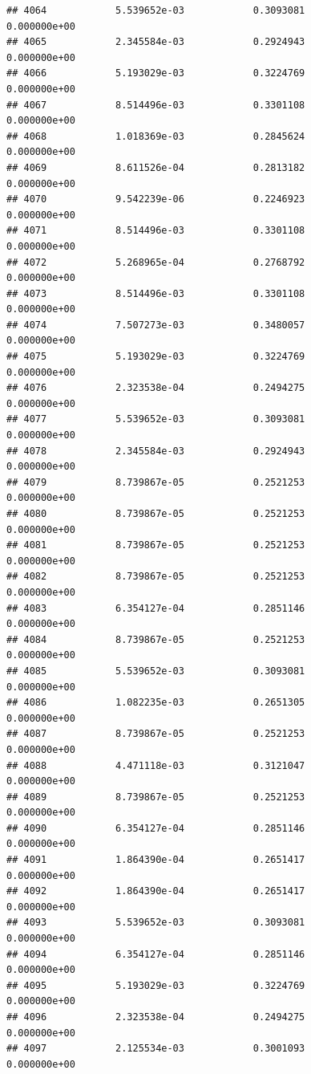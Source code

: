 \documentclass[
]{article}
\begin{document}
\begin{verbatim}
## 4064            5.539652e-03            0.3093081            0.000000e+00
## 4065            2.345584e-03            0.2924943            0.000000e+00
## 4066            5.193029e-03            0.3224769            0.000000e+00
## 4067            8.514496e-03            0.3301108            0.000000e+00
## 4068            1.018369e-03            0.2845624            0.000000e+00
## 4069            8.611526e-04            0.2813182            0.000000e+00
## 4070            9.542239e-06            0.2246923            0.000000e+00
## 4071            8.514496e-03            0.3301108            0.000000e+00
## 4072            5.268965e-04            0.2768792            0.000000e+00
## 4073            8.514496e-03            0.3301108            0.000000e+00
## 4074            7.507273e-03            0.3480057            0.000000e+00
## 4075            5.193029e-03            0.3224769            0.000000e+00
## 4076            2.323538e-04            0.2494275            0.000000e+00
## 4077            5.539652e-03            0.3093081            0.000000e+00
## 4078            2.345584e-03            0.2924943            0.000000e+00
## 4079            8.739867e-05            0.2521253            0.000000e+00
## 4080            8.739867e-05            0.2521253            0.000000e+00
## 4081            8.739867e-05            0.2521253            0.000000e+00
## 4082            8.739867e-05            0.2521253            0.000000e+00
## 4083            6.354127e-04            0.2851146            0.000000e+00
## 4084            8.739867e-05            0.2521253            0.000000e+00
## 4085            5.539652e-03            0.3093081            0.000000e+00
## 4086            1.082235e-03            0.2651305            0.000000e+00
## 4087            8.739867e-05            0.2521253            0.000000e+00
## 4088            4.471118e-03            0.3121047            0.000000e+00
## 4089            8.739867e-05            0.2521253            0.000000e+00
## 4090            6.354127e-04            0.2851146            0.000000e+00
## 4091            1.864390e-04            0.2651417            0.000000e+00
## 4092            1.864390e-04            0.2651417            0.000000e+00
## 4093            5.539652e-03            0.3093081            0.000000e+00
## 4094            6.354127e-04            0.2851146            0.000000e+00
## 4095            5.193029e-03            0.3224769            0.000000e+00
## 4096            2.323538e-04            0.2494275            0.000000e+00
## 4097            2.125534e-03            0.3001093            0.000000e+00

\end{verbatim}
\end{document}
